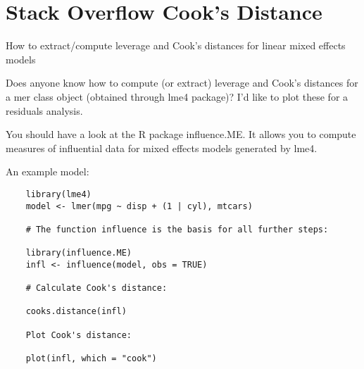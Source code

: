 \section{Stack Overflow Cook's Distance}
How to extract/compute leverage and Cook's distances for linear mixed effects models

Does anyone know how to compute (or extract) leverage and Cook's distances for a mer class object (obtained through lme4 package)? I'd like to plot these for a residuals analysis.

You should have a look at the R package influence.ME. It allows you to compute measures of influential data for mixed effects models generated by lme4.

An example model:

\begin{framed}
	\begin{verbatim}
	library(lme4)
	model <- lmer(mpg ~ disp + (1 | cyl), mtcars)
	
	# The function influence is the basis for all further steps:
	
	library(influence.ME)
	infl <- influence(model, obs = TRUE)
	
	# Calculate Cook's distance:
	
	cooks.distance(infl)
	
	Plot Cook's distance:
	
	plot(infl, which = "cook")
	
	
	\end{verbatim}
\end{framed}

